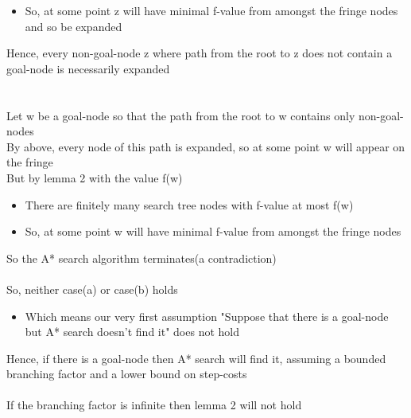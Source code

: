\documentclass{article}[18pt]
\begin{document}
\begin{itemize}
	\item So, at some point z will have minimal f-value from amongst the fringe nodes and so be expanded
\end{itemize}
Hence, every non-goal-node z where path from the root to z does not contain a goal-node is necessarily expanded\\
\\
\\
Let w be a goal-node so that the path from the root to w contains only non-goal-nodes\\
By above, every node of this path is expanded, so at some point w will appear on the fringe\\
But by lemma 2 with the value f(w)
\begin{itemize}
	\item There are finitely many search tree nodes with f-value at most f(w)
	\item So, at some point w will have minimal f-value from amongst the fringe nodes
\end{itemize}
So the A* search algorithm terminates(a contradiction)\\
\\
So, neither case(a) or case(b) holds
\begin{itemize}
	\item Which means our very first assumption "Suppose that there is a goal-node but A* search doesn't find it" does not hold
\end{itemize}
Hence, if there is a goal-node then A* search will find it, assuming a bounded branching factor and a lower bound on step-costs\\
\\
If the branching factor is infinite then lemma 2 will not hold
\end{document}

